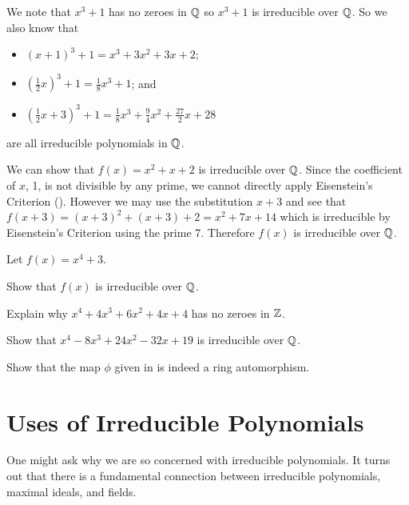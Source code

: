 \begin{example}
    We note that $x^3 + 1$ has no zeroes in $\mathbb{Q}$ so $x^3 + 1$ is irreducible over $\mathbb{Q}$. So we also know that
    \begin{itemize}
        \item $(x+1)^3 + 1 = x^3 + 3x^2 + 3x + 2$;
        \item $(\frac12x)^3 + 1 = \frac18x^3 + 1$; and
        \item $(\frac12x + 3)^3 + 1 = \frac18x^3 + \frac94x^2 + \frac{27}2x + 28$
    \end{itemize}
    are all irreducible polynomials in $\mathbb{Q}$.
\end{example}

\begin{example}
    We can show that $f(x) = x^2 + x + 2$ is irreducible over $\mathbb{Q}$. Since the coefficient of $x$, 1, is not divisible by any prime, we cannot directly apply Eisenstein's Criterion (). However we may use the substitution $x + 3$ and see that $f(x+3) = (x+3)^2 + (x+3) + 2 = x^2 + 7x + 14$ which is irreducible by Eisenstein's Criterion using the prime 7. Therefore $f(x)$ is irreducible over $\mathbb{Q}$.
\end{example}

\begin{exercise}
    Let $f(x) = x^4 + 3$.
    \begin{partquestions}{\roman*}
        \item Show that $f(x)$ is irreducible over $\mathbb{Q}$.
        \item Explain why $x^4 + 4x^3 + 6x^2 + 4x + 4$ has no zeroes in $\mathbb{Z}$.
        \item Show that $x^4 - 8x^3 + 24x^2 - 32x + 19$ is irreducible over $\mathbb{Q}$.
    \end{partquestions}
\end{exercise}

\begin{exercise}\label{exercise-substitution-by-constant-factor-multiple-map}
    Show that the map $\phi$ given in  is indeed a ring automorphism.
\end{exercise}

\section{Uses of Irreducible Polynomials}
One might ask why we are so concerned with irreducible polynomials. It turns out that there is a fundamental connection between irreducible polynomials, maximal ideals, and fields.

